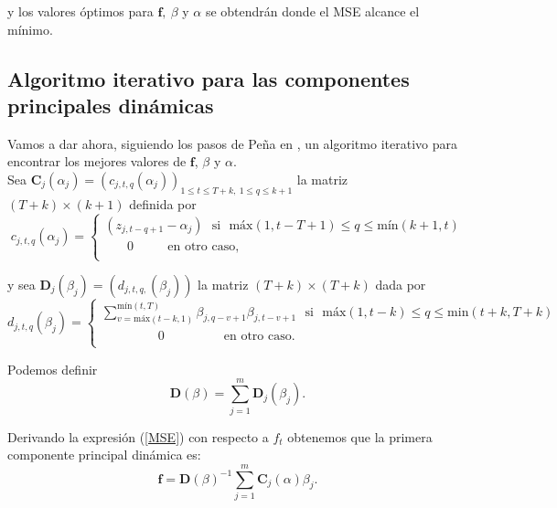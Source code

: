 y los valores óptimos para $\mathbf{f},\ \beta$ y $\alpha$ se obtendrán donde el MSE alcance el mínimo.\\

\subsection{Algoritmo iterativo para las componentes principales dinámicas}

Vamos a dar ahora, siguiendo los pasos de Peña en \cite{pena16}, un algoritmo iterativo para encontrar los mejores valores de $\mathbf{f}$, $\beta$ y $\alpha$.\\


Sea $\mathbf{C}_j(\alpha_j) = (c_{j,t,q}(\alpha_j))_{1 \leq t \leq T+k,\ 1 \leq q \leq k+1}$ la matriz $(T+k)\times (k+1)$ definida por 
\begin{equation*}
  c_{j,t,q}(\alpha_j) = 
  \left\lbrace
  \begin{array}{l}
     (z_{j,t-q+1} - \alpha_j)\ \ \ \text{si} \ \ \ \text{máx}(1, t-T+1) \leq q \leq \text{mín}(k+1,t) \\
     \ \ \ \ \ \ \ \ 0 \ \ \ \ \ \ \ \ \ \ \ \ \text{en otro caso}, \\
  \end{array}
  \right.
\end{equation*}

y sea $\mathbf{D}_j(\beta_j) = (d_{j,t,q,}(\beta_j))$ la matriz $(T+k) \times (T+k)$ dada por
\begin{equation*}
  d_{j,t,q}(\beta_j) = 
  \left\lbrace
  \begin{array}{l}
     \sum_{v=\text{máx}(t-k,1)}^{\text{mín}(t,T)} \beta_{j,q-v+1} \beta_{j,t-v+1} \ \ \ \text{si} \ \ \ \text{máx}(1, t-k) \leq q \leq \text{min}(t+k,T+k) \\
     \ \ \ \ \ \ \ \ \ \ \ \ \ \ \ \ \ \ \ \ 0 \ \ \ \ \ \ \ \ \ \ \ \ \ \ \ \ \ \ \ \ \ \text{en otro caso}. \\
  \end{array}
  \right.
\end{equation*}

Podemos definir 
\[	\mathbf{D}(\beta) = \sum_{j=1}^m \mathbf{D}_j(\beta_j).	\]

Derivando la expresión (\ref{MSE}) con respecto a $f_t$ obtenemos que la primera componente principal dinámica es: %
\begin{equation}\label{eq:deff}
	\mathbf{f} = \mathbf{D}(\beta)^{-1} \sum_{j=1}^m \mathbf{C}_j(\alpha)\beta_j.
\end{equation}

